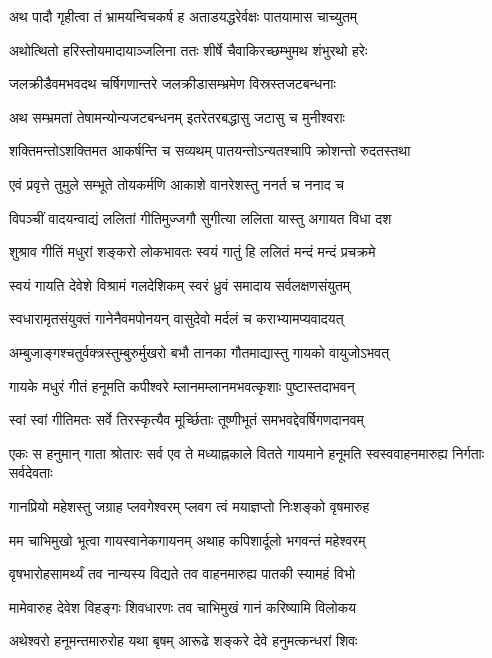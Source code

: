 \twolineshloka
{अथ पादौ गृहीत्वा तं भ्रामयन्विचकर्ष ह}
{अताडयद्धरेर्वक्षः पातयामास चाच्युतम्}%

\twolineshloka
{अथोत्थितो हरिस्तोयमादायाञ्जलिना ततः}
{शीर्षे चैवाकिरच्छम्भुमथ शंभुरथो हरेः}%

\twolineshloka
{जलक्रीडैवमभवदथ चर्षिगणान्तरे}
{जलक्रीडासम्भ्रमेण विस्रस्तजटबन्धनाः}%

\twolineshloka
{अथ सम्भ्रमतां तेषामन्योन्यजटबन्धनम्}
{इतरेतरबद्धासु जटासु च मुनीश्वराः}%

\twolineshloka
{शक्तिमन्तोऽशक्तिमत आकर्षन्ति च सव्यथम्}
{पातयन्तोऽन्यतश्चापि क्रोशन्तो रुदतस्तथा}%

\twolineshloka
{एवं प्रवृत्ते तुमुले सम्भूते तोयकर्मणि}
{आकाशे वानरेशस्तु ननर्त च ननाद च}%

\twolineshloka
{विपञ्चीं वादयन्वाद्यं ललितां गीतिमुज्जगौ}
{सुगीत्या ललिता यास्तु अगायत विधा दश}%

\twolineshloka
{शुश्राव गीतिं मधुरां शङ्करो लोकभावतः}
{स्वयं गातुं हि ललितं मन्दं मन्दं प्रचक्रमे}%

\twolineshloka
{स्वयं गायति देवेशे विश्रामं गलदेशिकम्}
{स्वरं ध्रुवं समादाय सर्वलक्षणसंयुतम्}%

\twolineshloka
{स्वधारामृतसंयुक्तं गानेनैवमपोनयन्}
{वासुदेवो मर्दलं च कराभ्यामप्यवादयत्}%

\twolineshloka
{अम्बुजाङ्गश्चतुर्वक्त्रस्तुम्बुरुर्मुखरो बभौ}
{तानका गौतमाद्यास्तु गायको वायुजोऽभवत्}%

\twolineshloka
{गायके मधुरं गीतं हनूमति कपीश्वरे}
{म्लानमम्लानमभवत्कृशाः पुष्टास्तदाभवन्}%

\twolineshloka
{स्वां स्वां गीतिमतः सर्वे तिरस्कृत्यैव मूर्च्छिताः}
{तूष्णीभूतं समभवद्देवर्षिगणदानवम्}%

\threelineshloka
{एकः स हनुमान् गाता श्रोतारः सर्व एव ते}
{मध्याह्नकाले वितते गायमाने हनूमति}
{स्वस्ववाहनमारुह्य निर्गताः सर्वदेवताः}%

\twolineshloka
{गानप्रियो महेशस्तु जग्राह प्लवगेश्वरम्}
{प्लवग त्वं मयाज्ञप्तो निःशङ्को वृषमारुह}%

\twolineshloka
{मम चाभिमुखो भूत्वा गायस्वानेकगायनम्}
{अथाह कपिशार्दूलो भगवन्तं महेश्वरम्}%

\twolineshloka
{वृषभारोहसामर्थ्यं तव नान्यस्य विद्यते}
{तव वाहनमारुह्य पातकी स्यामहं विभो}%

\twolineshloka
{मामेवारुह देवेश विहङ्गः शिवधारणः}
{तव चाभिमुखं गानं करिष्यामि विलोकय}%

\twolineshloka
{अथेश्वरो हनूमन्तमारुरोह यथा बृषम्}
{आरूढे शङ्करे देवे हनुमत्कन्धरां शिवः}%

